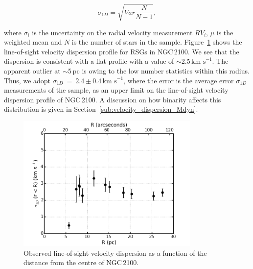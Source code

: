 \documentclass[useAMS,usenatbib]{mn2e}
\def\kms{$\mbox{km s}^{-1}$}
\begin{document}
\begin{equation}
  \sigma_{1D} = \sqrt{Var \frac{N}{N - 1}},
\end{equation}

\noindent where $\sigma_{i}$ is the uncertainty on the radial velocity measurement $RV_{i}$, $\mu$ is the weighted mean and $N$ is the number of stars in the sample.
Figure~\ref{fig:sig1d} shows the line-of-sight velocity dispersion profile for RSGs in NGC\,2100.
We see that the dispersion is consistent with a flat profile with a value of $\sim$2.5\,\kms.
The apparent outlier at $\sim$5\,pc is owing to the low number statistics within this radius.
Thus, we adopt $\sigma_{1D}~=~2.4\pm0.4\,$\kms, where the error is the average error $\sigma_{1D}$ measurements of the sample, as an upper limit on the line-of-sight velocity dispersion profile of NGC\,2100.
A discussion on how binarity affects this distribution is given in Section~\ref{sub:velocity_dispersion_Mdyn}.



\begin{figure}
 \includegraphics[width=9.0cm]{NGC2100-sig1d-v6}
 \caption{Observed line-of-sight velocity dispersion as a function of the distance from the centre of NGC\,2100.
\label{fig:sig1d}
          }
\end{figure}


\end{document}
